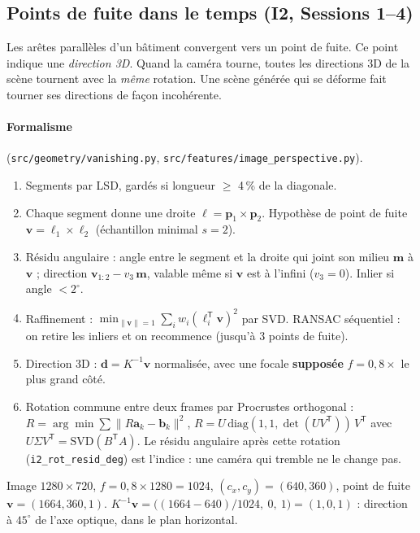 \documentclass[11pt,a4paper]{article}
\newcommand{\T}{^{\mathsf T}}
\begin{document}
\subsection{Points de fuite dans le temps (I2, Sessions 1--4)}

\begin{intuition}
Les arêtes parallèles d'un bâtiment convergent vers un point de fuite. Ce point indique une
\emph{direction 3D}. Quand la caméra tourne, toutes les directions 3D de la scène tournent avec la
\emph{même} rotation. Une scène générée qui se déforme fait tourner ses directions de façon
incohérente.
\end{intuition}

\paragraph{Formalisme} (\texttt{src/geometry/vanishing.py}, \texttt{src/features/image\_perspective.py}).
\begin{enumerate}
  \item Segments par LSD, gardés si longueur $\ge$ 4\,\% de la diagonale.
  \item Chaque segment donne une droite $\boldsymbol\ell=\mathbf p_1\times\mathbf p_2$. Hypothèse de
        point de fuite $\mathbf v=\boldsymbol\ell_1\times\boldsymbol\ell_2$ (échantillon minimal $s=2$).
  \item Résidu angulaire : angle entre le segment et la droite qui joint son milieu $\mathbf m$ à
        $\mathbf v$ ; direction $\mathbf v_{1:2}-v_3\,\mathbf m$, valable même si $\mathbf v$ est à
        l'infini ($v_3=0$). Inlier si angle $<2^\circ$.
  \item Raffinement : $\min_{\|\mathbf v\|=1}\sum_i w_i(\boldsymbol\ell_i\T\mathbf v)^2$ par SVD.
        RANSAC séquentiel : on retire les inliers et on recommence (jusqu'à 3 points de fuite).
  \item Direction 3D : $\mathbf d=K^{-1}\mathbf v$ normalisée, avec une focale \textbf{supposée}
        $f=0{,}8\times$ le plus grand côté.
  \item Rotation commune entre deux frames par Procrustes orthogonal :
        $R=\arg\min\sum\|R\mathbf a_k-\mathbf b_k\|^2$, $R=U\,\mathrm{diag}(1,1,\det(UV\T))\,V\T$ avec
        $U\Sigma V\T=\mathrm{SVD}(B\T A)$. Le résidu angulaire après cette rotation
        (\texttt{i2\_rot\_resid\_deg}) est l'indice : une caméra qui tremble ne le change pas.
\end{enumerate}

\begin{exemple}
Image $1280\times720$, $f=0{,}8\times1280=1024$, $(c_x,c_y)=(640,360)$, point de fuite
$\mathbf v=(1664,360,1)$. $K^{-1}\mathbf v=\bigl((1664-640)/1024,\ 0,\ 1\bigr)=(1,0,1)$ : direction à
$45^\circ$ de l'axe optique, dans le plan horizontal.
\end{exemple}
\end{document}
